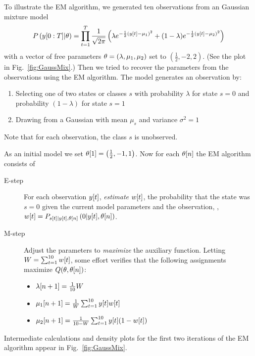To illustrate the EM algorithm, we generated ten observations from an
\iid Gaussian mixture model 
\begin{equation}
  \label{eq:GaussMix}
  P\left(y[0:T]|\theta \right) = \prod_{t=1}^T
  \frac{1}{\sqrt{2\pi}} \left( \lambda e^{-\frac{1}{2}
  ({y}{[t]}-\mu_1)^2} +
  (1-\lambda) e^{-\frac{1}{2} ({y}{[t]}-\mu_2)^2 } \right)
\end{equation}
with a vector of free parameters $\theta = (\lambda,\mu_1,\mu_2)$ set
to $(\frac{1}{2},-2,2)$.  (See the plot in Fig.~\ref{fig:GaussMix}.)
Then we tried to recover the parameters from the observations using
the EM algorithm.  The model generates an observation by:
\begin{enumerate}
\item Selecting one of two states or classes $s$ with probability
  $\lambda$ for state $s=0$ and probability $(1-\lambda)$ for state $s=1$
\item Drawing from a Gaussian with mean $\mu_s$ and variance $\sigma^2
  = 1$
\end{enumerate}
Note that for each observation, the class $s$ is unobserved.

As an initial model we set ${\theta}{[1]} = \left( \frac{1}{2}, -1, 1
\right)$.  Now for each ${\theta}{[n]}$ the EM algorithm consists of
\begin{description}
\item[E-step] For each observation ${y}{[t]}$, \emph{estimate}
  ${w}{[t]}$, the probability that the state was $s=0$ given the
  current model parameters and the observation, \ie, ${w}{[t]} =
  P_{{s}{[t]}|{y}{[t]},{\theta}{[n]}} \left(0|{y}{[t]},
    {\theta}{[n]}\right)$.
\item[M-step] Adjust the parameters to \emph{maximize} the auxiliary
  function.  Letting $W = \sum_{t=1}^{10} {w}{[t]}$, some effort
  verifies that the following assignments maximize
  $Q(\theta,{\theta}{[n]})$:
  \begin{itemize}
  \item ${\lambda}{[n+1]} = \frac{1}{10} W$
  \item ${\mu_1}{[n+1]} = \frac{1}{W}\sum_{t=1}^{10} {y}{[t]} {w}{[t]}$
  \item ${\mu_2}{[n+1]} = \frac{1}{10-W}\sum_{t=1}^{10} {y}{[t]} (1-{w}{[t]})$
  \end{itemize}
\end{description}

Intermediate calculations and density plots for the first two
iterations of the EM algorithm appear in Fig.~\ref{fig:GaussMix}.

